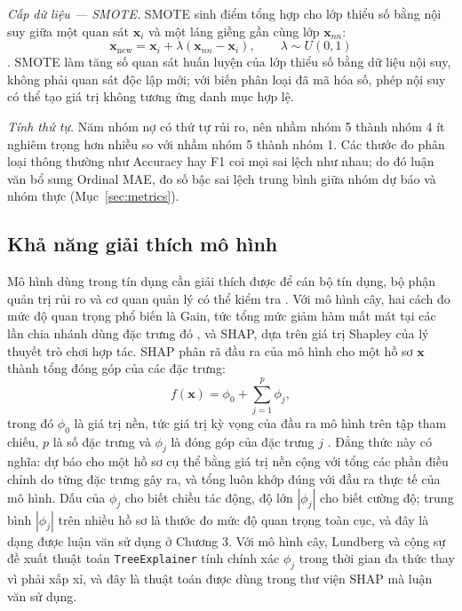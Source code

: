 \noindent\textit{Cấp dữ liệu --- SMOTE.} SMOTE sinh điểm tổng hợp cho lớp thiểu số bằng nội suy giữa một quan sát $\mathbf{x}_i$ và một láng giềng gần cùng lớp $\mathbf{x}_{nn}$:
\[
\mathbf{x}_{\mathrm{new}}
=
\mathbf{x}_i+\lambda\left(\mathbf{x}_{nn}-\mathbf{x}_i\right),
\qquad \lambda\sim U(0,1)
\]
\cite{chawla2002smote}. SMOTE làm tăng số quan sát huấn luyện của lớp thiểu số bằng dữ liệu nội suy, không phải quan sát độc lập mới; với biến phân loại đã mã hóa số, phép nội suy có thể tạo giá trị không tương ứng danh mục hợp lệ.

\noindent\textit{Tính thứ tự.} Năm nhóm nợ có thứ tự rủi ro, nên nhầm nhóm 5 thành nhóm 4 ít nghiêm trọng hơn nhiều so với nhầm nhóm 5 thành nhóm 1. Các thước đo phân loại thông thường như Accuracy hay F1 coi mọi sai lệch như nhau; do đó luận văn bổ sung Ordinal MAE, đo số bậc sai lệch trung bình giữa nhóm dự báo và nhóm thực (Mục~\ref{sec:metrics}).

\subsection{Khả năng giải thích mô hình}
\label{sec:shap-theory}

Mô hình dùng trong tín dụng cần giải thích được để cán bộ tín dụng, bộ phận quản trị rủi ro và cơ quan quản lý có thể kiểm tra \cite{bussmann2021explainable}. Với mô hình cây, hai cách đo mức độ quan trọng phổ biến là Gain, tức tổng mức giảm hàm mất mát tại các lần chia nhánh dùng đặc trưng đó \cite{xgboost_api_docs}, và SHAP, dựa trên giá trị Shapley của lý thuyết trò chơi hợp tác. SHAP phân rã đầu ra của mô hình cho một hồ sơ $\mathbf{x}$ thành tổng đóng góp của các đặc trưng:
\[
f(\mathbf{x})=\phi_0+\sum_{j=1}^{p}\phi_j,
\]
trong đó $\phi_0$ là giá trị nền, tức giá trị kỳ vọng của đầu ra mô hình trên tập tham chiếu, $p$ là số đặc trưng và $\phi_j$ là đóng góp của đặc trưng $j$ \cite{lundberg2017unified}. Đẳng thức này có nghĩa: dự báo cho một hồ sơ cụ thể bằng giá trị nền cộng với tổng các phần điều chỉnh do từng đặc trưng gây ra, và tổng luôn khớp đúng với đầu ra thực tế của mô hình. Dấu của $\phi_j$ cho biết chiều tác động, độ lớn $|\phi_j|$ cho biết cường độ; trung bình $|\phi_j|$ trên nhiều hồ sơ là thước đo mức độ quan trọng toàn cục, và đây là dạng được luận văn sử dụng ở Chương 3. Với mô hình cây, Lundberg và cộng sự \cite{lundberg2020tree} đề xuất thuật toán \mbox{\texttt{TreeExplainer}} tính chính xác $\phi_j$ trong thời gian đa thức thay vì phải xấp xỉ, và đây là thuật toán được dùng trong thư viện SHAP \cite{shap_docs} mà luận văn sử dụng.

